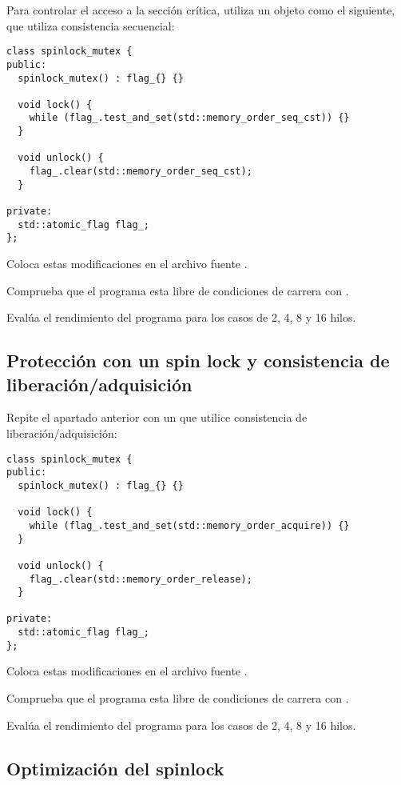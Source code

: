 Para controlar el acceso a la sección crítica, utiliza un objeto  como el siguiente,
que utiliza consistencia secuencial:
\begin{lstlisting}
class spinlock_mutex {
public:
  spinlock_mutex() : flag_{} {}

  void lock() {
    while (flag_.test_and_set(std::memory_order_seq_cst)) {}
  }

  void unlock() {
    flag_.clear(std::memory_order_seq_cst);
  }

private:
  std::atomic_flag flag_;
};
\end{lstlisting}

Coloca estas modificaciones en el archivo fuente .

Comprueba que el programa esta libre de condiciones de carrera con .

Evalúa el rendimiento del programa para los casos de 2, 4, 8 y 16 hilos.

\subsection{Protección con un spin lock y consistencia de liberación/adquisición}

Repite el apartado anterior con un  que utilice consistencia de
liberación/adquisición:

\begin{lstlisting}
class spinlock_mutex {
public:
  spinlock_mutex() : flag_{} {}

  void lock() {
    while (flag_.test_and_set(std::memory_order_acquire)) {}
  }

  void unlock() {
    flag_.clear(std::memory_order_release);
  }

private:
  std::atomic_flag flag_;
};
\end{lstlisting}

Coloca estas modificaciones en el archivo fuente .

Comprueba que el programa esta libre de condiciones de carrera con .

Evalúa el rendimiento del programa para los casos de 2, 4, 8 y 16 hilos.

\subsection{Optimización del spinlock}

